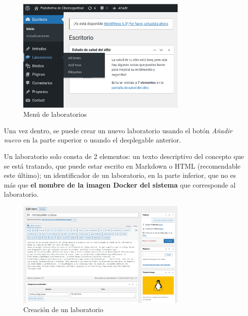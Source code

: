             \begin{figure}[!htbp]
                \centering

                \includegraphics[width=0.75\textwidth]{images/Capturas/localhost/laboratorios.png}
                \caption{Menú de laboratorios}
                \label{fig:laboratorios}
            \end{figure}

            Una vez dentro, se puede crear un nuevo laboratorio usando el botón \textit{Añadir nuevo} en la parte superior o usando el desplegable anterior.

            Un laboratorio solo consta de 2 elementos: un texto descriptivo del concepto que se está tratando, que puede estar escrito en Markdown o HTML (recomendable este último); un identificador de un laboratorio, en la parte inferior, que no es más que \textbf{el nombre de la imagen Docker del sistema} que corresponde al laboratorio.

            \begin{figure}[!htbp]
                \centering

                \includegraphics[width=0.75\textwidth]{images/Capturas/localhost/creacion.png}
                \caption{Creación de un laboratorio}
                \label{fig:anadir-laboratorio}
            \end{figure}

